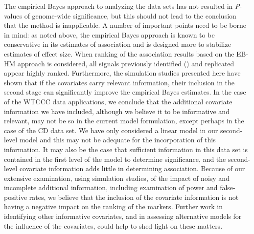 The empirical Bayes approach to analyzing the
\citet{Gichangi_Vach:2006}
data sets has not resulted in \textit{P}-values of genome-wide
significance, but this should not lead to the conclusion
that the method is inapplicable. A number of important
points need to be borne in mind: as noted above, the
empirical Bayes approach is known to be conservative in
its estimates of association and is designed more to
stabilize estimates of effect size. When ranking of the
association results based on the EB-HM approach is
considered, all signals previously identified
(\citealp{Barlow_Bartholomew:1972})
and replicated appear highly ranked. Furthermore, the
simulation studies presented here have shown that if
the covariates carry relevant information, their
inclusion in the second stage can significantly improve
the empirical Bayes estimates. In the case of the WTCCC
data applications, we conclude that the additional
covariate information we have included, although we believe
it to be informative and relevant, may not be so in the
current model formulation, except perhaps in the case
of the CD data set. We have only considered a linear model
in our second-level model and this may not be adequate for
the incorporation of this information. It may also be the
case that sufficient information in this data set is
contained in the first level of the model to determine
significance, and the second-level covariate information
adds little in determining association. Because of our
extensive examination, using simulation studies, of the
impact of noisy and incomplete additional information,
including examination of power and false-positive rates,
we believe that the inclusion of the covariate information
is not having a negative impact on the ranking of the
markers. Further work in identifying other informative
covariates, and in assessing alternative models for the
influence of the covariates, could help to shed light on
these matters.

